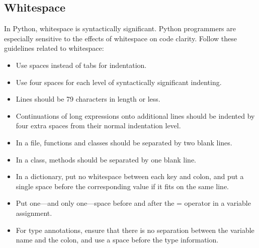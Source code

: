\documentclass{article}
\begin{document}
\subsection{Whitespace}
In Python, whitespace is syntactically significant. Python programmers
are especially sensitive to the effects of whitespace on code
clarity. Follow these guidelines related to whitespace:
\newcommand{\localtextbulletone}{\textcolor{brown}{\raisebox{.45ex}{\rule{.6ex}{.6ex}}}}
\renewcommand{\labelitemi}{\localtextbulletone}
\begin{itemize}
\item Use spaces instead of tabs for indentation.
\item Use four spaces for each level of syntactically significant indenting.
\item Lines should be 79 characters in length or less.
\item Continuations of long expressions onto additional lines should
be indented by four extra spaces from their normal indentation
level.
\item In a file, functions and classes should be separated by two blank
lines.
\item In a class, methods should be separated by one blank line.
\item In a dictionary, put no whitespace between each key and colon,
and put a single space before the corresponding value if it fits on
the same line.
\item Put one—and only one—space before and after the = operator in a
variable assignment.
\item For type annotations, ensure that there is no separation between
the variable name and the colon, and use a space before the type
information.
\end{itemize}


	
\end{document}
